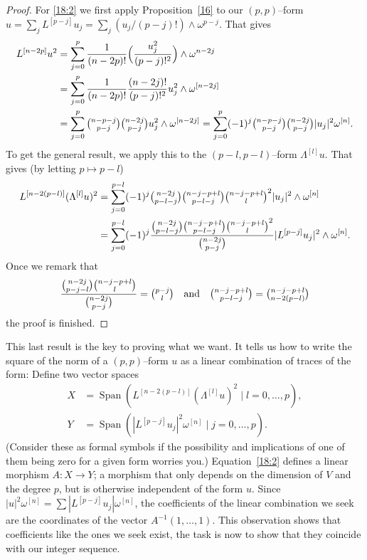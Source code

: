 \documentclass[11pt,a4paper]{amsart}
\def\^#1{^{[#1]}}
\def\wp#1{\omega^{[#1]}}
\def\lp#1{L^{[#1]}}
\def\Lp#1{\Lambda^{[#1]}}
\theoremstyle{definition}
\numberwithin{equation}{section}
\begin{document}
\begin{proof}
For \eqref{18:2} we first 
apply Proposition~\ref{16} to our $(p,p)$--form
$u = \sum_j \lp{p-j} u_j = \sum_j (u_j/(p-j)!) \wedge \omega^{p-j}$.
That gives
\begin{align*}
\lp{n-2p} u^2 
&= \sum_{j=0}^p \frac{1}{(n-2p)!}\Bigl( \frac{u_j^2}{(p-j)!^2} \Bigr) 
\wedge \omega^{n-2j}\\
&= \sum_{j=0}^p \frac{1}{(n-2p)!}\frac{(n-2j)!}{(p-j)!^2} 
u_j^2 \wedge \wp{n-2j}\\
&= \sum_{j=0}^p \tbinom{n-p-j}{p-j} \tbinom{n-2j}{p-j}
u_j^2 \wedge \wp{n-2j}
= \sum_{j=0}^p (-1)^j \tbinom{n-p-j}{p-j} \tbinom{n-2j}{p-j}
\lvert u_j \rvert^2 \wp{n}.
\end{align*}
To get the general result, we apply this to the $(p-l,p-l)$--form $\Lp l
u$. That gives (by letting $p \mapsto p - l$)
\begin{align*}
  \lp{n-2(p-l)} (\Lp l u)^2   
  &= \sum_{j=0}^{p-l} 
  (-1)^j
  \tbinom{n-2j}{p-l-j}
  \tbinom{n-j-p+l}{p-l-j}
  \tbinom{n-j-p+l}{l}^2
  \lvert u_j \rvert^2
  \wedge \wp n
  \\
  &= \sum_{j=0}^{p-l} 
  (-1)^j
  \frac{
  \tbinom{n-2j}{p-l-j}
  \tbinom{n-j-p+l}{p-l-j}
  \tbinom{n-j-p+l}{l}^2
  }{\tbinom{n-2j}{p-j}}
  \lvert \lp{p-j} u_j \rvert^2
  \wedge \wp n.
\end{align*}
Once we remark that
$$
\frac{\binom{n-2j}{p-j-l} \binom{n-j-p+l}{l}}{\binom{n-2j}{p-j}}
= \tbinom{p-j}{l}
\quad\hbox{and}\quad
\tbinom{n-j-p+l}{p-l-j} = \tbinom{n-j-p+l}{n-2(p-l)}
$$
the proof is finished.
\end{proof}


This last result is the key to proving what we want. It tells us how to
write the square of the norm of a $(p,p)$--form $u$ as a linear
combination of traces of the form: Define two vector spaces 
\begin{align*}
X &= \operatorname{Span}(\lp{n-2(p-l)} (\Lp l u)^2 \mid l = 0,\ldots,p),
\\
Y &= \operatorname{Span}(|\lp{p-j}u_j|^2 \wp{n} \mid j=0,\ldots,p).
\end{align*}
(Consider these as formal symbols if the possibility and implications of
one of them being zero for a given form worries you.) Equation~\eqref{18:2}
defines a linear morphism $A : X \to Y$; a morphism that only depends
on the dimension of $V$ and the degree $p$, but is otherwise independent of
the form $u$. Since $|u|^2\omega\^n = \sum |\lp{p-j}u_j| \omega\^n$,  
the coefficients of the linear combination we seek are the coordinates of
the vector $A^{-1}(1,\ldots,1)$. This observation shows that coefficients like the ones we seek exist, the task is now to show that they coincide with our integer sequence.
\end{document}
